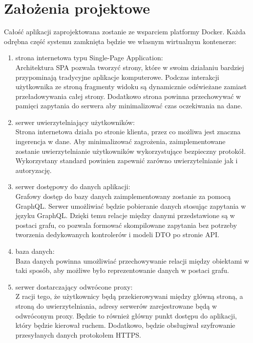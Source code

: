 \section{Założenia projektowe}
	Całość aplikacji zaprojektowana zostanie ze wsparciem platformy Docker.
	Każda odrębna część systemu zamknięta będzie we własnym wirtualnym kontenerze:
	\begin{enumerate}
		\item strona internetowa typu Single-Page Application:\\
			Architektura SPA pozwala tworzyć strony, które w swoim działaniu bardziej przypominają tradycyjne aplikacje komputerowe.
			Podczas interakcji użytkownika ze stroną fragmenty widoku są dynamicznie odświeżane zamiast przeładowywania całej strony.
			Dodatkowo strona powinna przechowywać w pamięci zapytania do serwera aby minimalizować czas oczekiwania na dane.

		\item serwer uwierzytelniający użytkowników:\\
			Strona internetowa działa po stronie klienta, przez co możliwa jest znaczna ingerencja w dane.
			Aby minimalizować zagrożenia, zaimplementowane zostanie uwierzytelnianie użytkowników wykorzystujące bezpieczny protokół.
			Wykorzystany standard powinien zapewnić zarówno uwierzytelnianie jak i autoryzację.

		\item serwer dostępowy do danych aplikacji:\\
			Grafowy dostęp do bazy danych zaimplementowany zostanie za pomocą GraphQL\@.
			Serwer umożliwiać będzie pobieranie danych stosując zapytania w języku GraphQL\@.
			Dzięki temu relacje między danymi przedstawione są w postaci grafu,
			co pozwala formować skompilowane zapytania bez potrzeby tworzenia dedykowanych kontrolerów i modeli DTO po stronie API\@.

		\item baza danych:\\
			Baza danych powinna umożliwiać przechowywanie relacji między obiektami w taki sposób,
			aby możliwe było reprezentowanie danych w postaci grafu.

		\item serwer dostarczający odwrócone proxy:\\
			Z racji tego, że użytkownicy będą przekierowywani między główną stroną, a stroną do uwierzytelniania,
			adresy serwerów zarejestrowane będą w odwróconym proxy.
			Będzie to również główny punkt dostępu do aplikacji, który będzie kierował ruchem.
			Dodatkowo, będzie obsługiwał szyfrowanie przesyłanych danych protokołem HTTPS\@.

	\end{enumerate}
